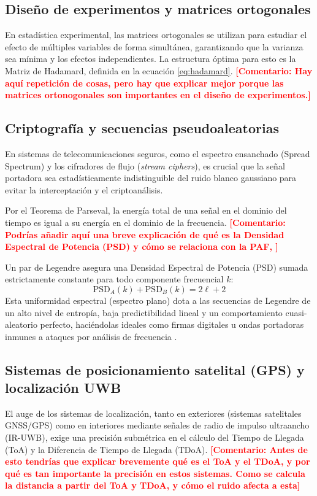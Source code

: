 \documentclass[12pt,a4paper]{tfg_domingo}
\newcommand{\Comentario}[1]{\textcolor{red}{\textbf{[Comentario:
      #1]}}}
\begin{document}
\subsection{Diseño de experimentos y matrices ortogonales}
En estadística experimental, las matrices ortogonales se utilizan para
estudiar el efecto de múltiples variables de forma simultánea,
garantizando que la varianza sea mínima y los efectos
independientes. La estructura óptima para esto es la Matriz de
Hadamard, definida en la ecuación \eqref{eq:hadamard}.
\Comentario{Hay aquí repetición de cosas, pero hay que explicar mejor
  porque las matrices ortonogonales son importantes en el diseño de
  experimentos.}

\subsection{Criptografía y secuencias pseudoaleatorias}
En sistemas de telecomunicaciones seguros, como el espectro ensanchado (Spread Spectrum) y los cifradores de flujo (\emph{stream ciphers}), es crucial que la señal portadora sea estadísticamente indistinguible del ruido blanco gaussiano para evitar la interceptación y el criptoanálisis.

Por el Teorema de Parseval, la energía total de una señal en el
dominio del tiempo es igual a su energía en el dominio de la
frecuencia.
\Comentario{Podrías añadir aquí una breve explicación de qué es la Densidad
  Espectral de Potencia (PSD) y cómo se relaciona con la PAF, }

Un par de Legendre asegura una Densidad Espectral de Potencia (PSD) sumada estrictamente constante para todo componente frecuencial $k$:
$$ \text{PSD}_A(k) + \text{PSD}_B(k) = 2\ell + 2 $$
Esta uniformidad espectral (espectro plano) dota a las secuencias de Legendre de un alto nivel de entropía, baja predictibilidad lineal y un comportamiento cuasi-aleatorio perfecto, haciéndolas ideales como firmas digitales u ondas portadoras inmunes a ataques por análisis de frecuencia \cite{damgaard1988randomness}.

\subsection{Sistemas de posicionamiento satelital (GPS) y localización UWB}
El auge de los sistemas de localización, tanto en exteriores (sistemas
satelitales GNSS/GPS) como en interiores mediante señales de radio de
impulso ultraancho (IR-UWB), exige una precisión submétrica en el
cálculo del Tiempo de Llegada (ToA) y la Diferencia de Tiempo de
Llegada (TDoA).
\Comentario{Antes de esto tendrías que explicar brevemente qué es el
  ToA y el TDoA, y por qué es tan importante la precisión en estos
  sistemas. Como se calcula la distancia a partir del ToA y TDoA, y cómo el ruido afecta a esta}
\end{document}
